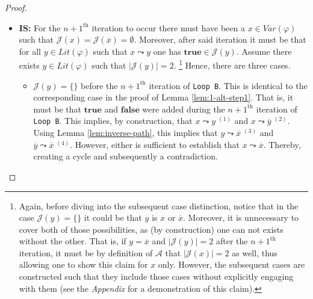 \documentclass [11pt]{article}
\newcommand{\True}{\mathbf{true}}
\newcommand{\False}{\mathbf{false}}
\newcommand{\var}{\mathit{Var}}
\newcommand{\lit}{\mathit{Lit}}
\newcommand{\reach}{\leadsto}
\begin{document}
\begin{proof}
\begin{itemize}
\item \textbf{IS:}  For the $n+1^{\text{th}}$ iteration to occur there must have been a $x \in \var(\varphi)$ such that $\mathcal{J}(x) =\mathcal{J}(\overline{x})= \emptyset$. Moreover, after said iteration it must be that for all $y \in \lit(\varphi)$ such that $x \reach y$ one has $\True \in \mathcal{J}(y)$. Assume there exists $y \in \lit(\varphi)$ such that $|\mathcal{J}(y)|=2$. 
\footnote{Again, before diving into the subsequent case distinction, notice that in the case $\mathcal{J}(y)=\{\}$ it could be that $y$ is $x$ or $\overline{x}$. Moreover, it is unnecessary to cover both of those possibilities, as (by construction) one can not exists without the other. That is, if $y=\overline{x}$ and $|\mathcal{J}(y)|=2$ after the  $n+1^{\text{th}}$ iteration, it must be by definition of $\mathcal{A}$ that  $|\mathcal{J}(x)|=2$ as well, thus allowing one to show this claim for $x$ only.  However, the subsequent cases are constructed such that they include those cases without explicitly engaging with them  (see the \emph{Appendix }for a demonstration of this claim). } 
Hence, there are three cases. 
\begin{itemize}
\item $\mathcal{J}(y)=\{\}$ before the $n+1^{\text{th}}$ iteration of \texttt{Loop B}. This is identical to the corresponding case in the proof of Lemma \ref{lem:1-alt-step1}. That is, it must be that $\True$ and $\False$  were added during the $n+1^{\text{th}}$ iteration of \texttt{Loop B}. This implies, by construction, that $x \reach y\; ^{(1)}$ and $x \reach \overline{y}\; ^{(2)}$. Using Lemma \ref{lem:inverse-path}, this implies that $y \reach \overline{x}\;^{(3)}$ and $\overline{y} \reach \overline{x}\;^{(4)}$. However, either is sufficient to establish that $x \reach \overline{x}$. Thereby, creating a cycle and subsequently a contradiction. 

\begin{center}
\end{center}
\end{itemize}
\end{itemize}
\end{proof}
\end{document}
